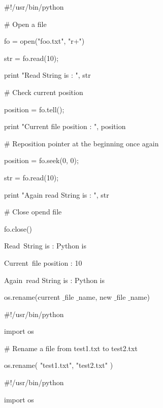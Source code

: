 \vspace{12pt}
\noindent 
 $  \#  $!/usr/bin/python \par
\vspace{12pt}
\noindent 
 $  \#  $ Open a file \par
\noindent 
fo = open("foo.txt", "r+") \par
\noindent 
str = fo.read(10); \par
\noindent 
print "Read String is : ", str \par
\vspace{12pt}
\noindent 
 $  \#  $ Check current position \par
\noindent 
position = fo.tell(); \par
\noindent 
print "Current file position : ", position \par
\vspace{12pt}
\noindent 
 $  \#  $ Reposition pointer at the beginning once again \par
\noindent 
position = fo.seek(0, 0); \par
\noindent 
str = fo.read(10); \par
\noindent 
print "Again read String is : ", str \par
\noindent 
 $  \#  $ Close opend file \par
\noindent 
fo.close() \par
\vspace{12pt}
\noindent 
Read~String is :  Python is \par
\noindent 
Current~file position :  10 \par
\noindent 
Again~read String is :  Python is \par
\vspace{12pt}
\noindent 
os.rename(current $  \_  $file $  \_  $name, new $  \_  $file $  \_  $name) \par
\vspace{12pt}
\noindent 
 $  \#  $!/usr/bin/python \par
\noindent 
import os \par
\vspace{12pt}
\noindent 
 $  \#  $ Rename a file from test1.txt to test2.txt \par
\noindent 
os.rename( "test1.txt", "test2.txt" ) \par
\vspace{12pt}
\noindent 
 $  \#  $!/usr/bin/python \par
\noindent 
import os \par
\vspace{12pt}
